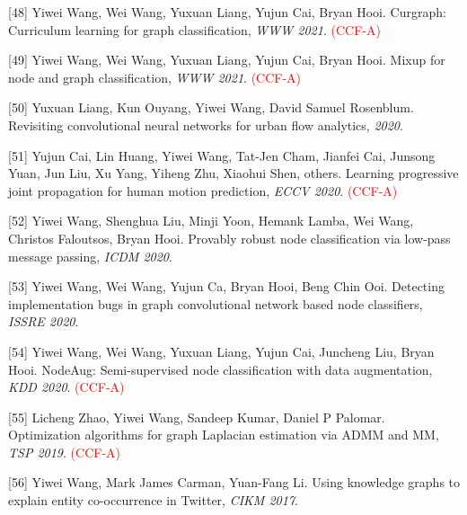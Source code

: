 [48] Yiwei Wang, Wei Wang, Yuxuan Liang, Yujun Cai, Bryan Hooi. Curgraph: Curriculum learning for graph classification, \textit{WWW 2021}. \textcolor{red}{(CCF-A)}

[49] Yiwei Wang, Wei Wang, Yuxuan Liang, Yujun Cai, Bryan Hooi. Mixup for node and graph classification, \textit{WWW 2021}. \textcolor{red}{(CCF-A)}

[50] Yuxuan Liang, Kun Ouyang, Yiwei Wang, David Samuel Rosenblum. Revisiting convolutional neural networks for urban flow analytics, \textit{ 2020}.

[51] Yujun Cai, Lin Huang, Yiwei Wang, Tat-Jen Cham, Jianfei Cai, Junsong Yuan, Jun Liu, Xu Yang, Yiheng Zhu, Xiaohui Shen, others. Learning progressive joint propagation for human motion prediction, \textit{ECCV 2020}. \textcolor{red}{(CCF-A)}

[52] Yiwei Wang, Shenghua Liu, Minji Yoon, Hemank Lamba, Wei Wang, Christos Faloutsos, Bryan Hooi. Provably robust node classification via low-pass message passing, \textit{ICDM 2020}.

[53] Yiwei Wang, Wei Wang, Yujun Ca, Bryan Hooi, Beng Chin Ooi. Detecting implementation bugs in graph convolutional network based node classifiers, \textit{ISSRE 2020}.

[54] Yiwei Wang, Wei Wang, Yuxuan Liang, Yujun Cai, Juncheng Liu, Bryan Hooi. NodeAug: Semi-supervised node classification with data augmentation, \textit{KDD 2020}. \textcolor{red}{(CCF-A)}

[55] Licheng Zhao, Yiwei Wang, Sandeep Kumar, Daniel P Palomar. Optimization algorithms for graph Laplacian estimation via ADMM and MM, \textit{TSP 2019}. \textcolor{red}{(CCF-A)}

[56] Yiwei Wang, Mark James Carman, Yuan-Fang Li. Using knowledge graphs to explain entity co-occurrence in Twitter, \textit{CIKM 2017}.